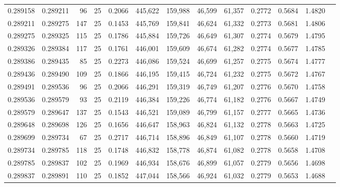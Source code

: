 \begin{tabular}{rrrrrrrrrrrrr}
0.289158 & 0.289211 &    96 &  25 &                                     0.2066 & 445,622 & 159,988 &  46,599 &  61,357 & 0.2772 & 0.5684 & 1.4820 \\
0.289211 & 0.289275 &   147 &  25 &                                     0.1453 & 445,769 & 159,841 &  46,624 &  61,332 & 0.2773 & 0.5681 & 1.4806 \\
0.289275 & 0.289325 &   115 &  25 &                                     0.1786 & 445,884 & 159,726 &  46,649 &  61,307 & 0.2774 & 0.5679 & 1.4795 \\
0.289326 & 0.289384 &   117 &  25 &                                     0.1761 & 446,001 & 159,609 &  46,674 &  61,282 & 0.2774 & 0.5677 & 1.4785 \\
0.289386 & 0.289435 &    85 &  25 &                                     0.2273 & 446,086 & 159,524 &  46,699 &  61,257 & 0.2775 & 0.5674 & 1.4777 \\
0.289436 & 0.289490 &   109 &  25 &                                     0.1866 & 446,195 & 159,415 &  46,724 &  61,232 & 0.2775 & 0.5672 & 1.4767 \\
0.289491 & 0.289536 &    96 &  25 &                                     0.2066 & 446,291 & 159,319 &  46,749 &  61,207 & 0.2776 & 0.5670 & 1.4758 \\
0.289536 & 0.289579 &    93 &  25 &                                     0.2119 & 446,384 & 159,226 &  46,774 &  61,182 & 0.2776 & 0.5667 & 1.4749 \\
0.289579 & 0.289647 &   137 &  25 &                                     0.1543 & 446,521 & 159,089 &  46,799 &  61,157 & 0.2777 & 0.5665 & 1.4736 \\
0.289648 & 0.289698 &   126 &  25 &                                     0.1656 & 446,647 & 158,963 &  46,824 &  61,132 & 0.2778 & 0.5663 & 1.4725 \\
0.289699 & 0.289734 &    67 &  25 &                                     0.2717 & 446,714 & 158,896 &  46,849 &  61,107 & 0.2778 & 0.5660 & 1.4719 \\
0.289734 & 0.289785 &   118 &  25 &                                     0.1748 & 446,832 & 158,778 &  46,874 &  61,082 & 0.2778 & 0.5658 & 1.4708 \\
0.289785 & 0.289837 &   102 &  25 &                                     0.1969 & 446,934 & 158,676 &  46,899 &  61,057 & 0.2779 & 0.5656 & 1.4698 \\
0.289837 & 0.289891 &   110 &  25 &                                     0.1852 & 447,044 & 158,566 &  46,924 &  61,032 & 0.2779 & 0.5653 & 1.4688 \\

\end{tabular}
